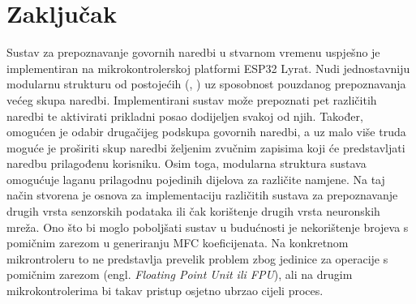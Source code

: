 \chapter{Zaključak}
\label{pog:zakljucak}

Sustav za prepoznavanje govornih naredbi u stvarnom vremenu uspješno je implementiran
na mikrokontrolerskoj platformi ESP32 Lyrat. Nudi jednostavniju modularnu
strukturu od postojećih (\cite{arm_kws}, \cite{tflmicrospeech}) uz sposobnost pouzdanog 
prepoznavanja većeg skupa
naredbi. Implementirani sustav može prepoznati pet
različitih naredbi te aktivirati prikladni posao dodijeljen svakoj od njih. 
Također, omogućen je odabir 
drugačijeg podskupa govornih naredbi, a uz malo više truda moguće je proširiti skup naredbi
željenim zvučnim zapisima koji će predstavljati naredbu prilagođenu korisniku.
Osim toga, modularna struktura sustava
omogućuje laganu prilagodnu pojedinih dijelova za različite namjene. Na taj način stvorena je
osnova za implementaciju različitih sustava za prepoznavanje drugih vrsta senzorskih podataka
ili čak korištenje drugih vrsta neuronskih mreža. Ono što bi moglo poboljšati sustav
u budućnosti je
nekorištenje brojeva s pomičnim zarezom u generiranju MFC koeficijenata. Na konkretnom
mikrontroleru to ne predstavlja prevelik problem zbog jedinice
za operacije s pomičnim zarezom (engl. \textit{Floating Point Unit ili FPU}),
ali na drugim mikrokontrolerima bi takav pristup osjetno ubrzao cijeli proces.


